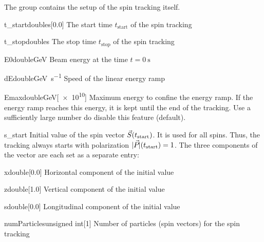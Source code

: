 \documentclass[a4paper]{scrartcl}
\begin{document}
The group  contains the setup of the spin tracking itself.\\[2mm]

\begin{configdoc}{t_start}{double}{\si{\s}}[0.0]
  The start time $t_\text{start}$ of the spin tracking
\end{configdoc}

\begin{configdoc}{t_stop}{double}{\si{\s}}
  The stop time $t_\text{stop}$ of the spin tracking
\end{configdoc}

\begin{configdoc}{E0}{double}{\si{\GeV}}
  Beam energy at the time $t=\SI{0}{\s}$
\end{configdoc}

\begin{configdoc}{dE}{double}{\si{\GeV\per\s}}
  Speed of the linear energy ramp
\end{configdoc}

\begin{configdoc}{Emax}{double}{\si{\GeV}}[\num{e10}]
  Maximum energy to confine the energy ramp.
  If the energy ramp reaches this energy, it is kept until the end of the tracking. Use a
  sufficiently large number do disable this feature (default).
\end{configdoc}

\begin{configdocgroup}{s_start}
  Initial value of the spin vector $\vec{S}_{}(t_\text{start})$. It is used for all spins.
  Thus, the tracking always starts with polarization $|\vec{P}_{}|(t_\text{start}) = 1$. The
  three components of the vector are each set as a separate entry:
  
  \begin{configdoc}{x}{double}{}[0.0]
    Horizontal component \sx of the initial value
  \end{configdoc}

  \begin{configdoc}{z}{double}{}[1.0]
    Vertical component \sz of the initial value
  \end{configdoc}

  \begin{configdoc}{s}{double}{}[0.0]
    Longitudinal component \slong of the initial value
  \end{configdoc}
\end{configdocgroup}

\begin{configdoc}{numParticles}{unsigned int}{}[1]
  Number of particles (spin vectors) for the spin tracking
\end{configdoc}
\end{document}
